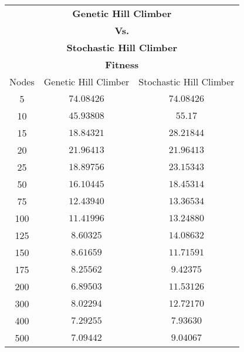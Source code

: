 \begin{tabular}{c|c|c}
    \multicolumn{3}{c}{\textbf{Genetic Hill Climber}}      \\
    \multicolumn{3}{c}{\textbf{Vs.}}                       \\
    \multicolumn{3}{c}{\textbf{Stochastic Hill Climber}}   \\
    \multicolumn{3}{c}{\textbf{Fitness}}                   \\
    \hline
    Nodes & Genetic Hill Climber & Stochastic Hill Climber \\
    \hline
    5     & $74.08426$           & $74.08426$              \\
    10    & $45.93808$           & $55.17$                 \\
    15    & $18.84321$           & $28.21844$              \\
    20    & $21.96413$           & $21.96413$              \\
    25    & $18.89756$           & $23.15343$              \\
    50    & $16.10445$           & $18.45314$              \\
    75    & $12.43940$           & $13.36534$              \\
    100   & $11.41996$           & $13.24880$              \\
    125   & $8.60325$            & $14.08632$              \\
    150   & $8.61659$            & $11.71591$              \\
    175   & $8.25562$            & $9.42375$               \\
    200   & $6.89503$            & $11.53126$              \\
    300   & $8.02294$            & $12.72170$              \\
    400   & $7.29255$            & $7.93630$               \\
    500   & $7.09442$            & $9.04067$               \\
\end{tabular}